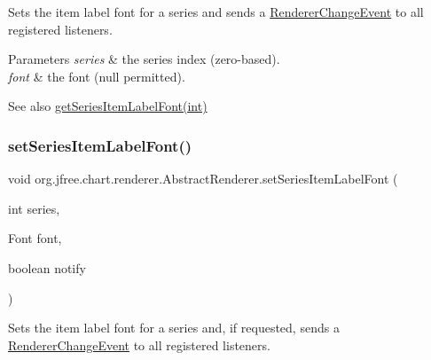 Sets the item label font for a series and sends a \mbox{\hyperlink{}{Renderer\+Change\+Event}} to all registered listeners.


\begin{DoxyParams}{Parameters}
{\em series} & the series index (zero-\/based). \\
\hline
{\em font} & the font ({\ttfamily null} permitted).\\
\hline
\end{DoxyParams}
\begin{DoxySeeAlso}{See also}
\mbox{\hyperlink{classorg_1_1jfree_1_1chart_1_1renderer_1_1_abstract_renderer_a541c5cf27a5e10f32716f802b7e6a392}{get\+Series\+Item\+Label\+Font(int)}} 
\end{DoxySeeAlso}
\mbox{\label{classorg_1_1jfree_1_1chart_1_1renderer_1_1_abstract_renderer_a32e7efcb198d49d38e05e8b2823dca04}} 
\subsubsection{\texorpdfstring{set\+Series\+Item\+Label\+Font()}{setSeriesItemLabelFont()}\hspace{0.1cm}{\footnotesize\ttfamily [2/2]}}
{\footnotesize\ttfamily void org.\+jfree.\+chart.\+renderer.\+Abstract\+Renderer.\+set\+Series\+Item\+Label\+Font (\begin{DoxyParamCaption}\item[{int}]{series,  }\item[{Font}]{font,  }\item[{boolean}]{notify }\end{DoxyParamCaption})}

Sets the item label font for a series and, if requested, sends a \mbox{\hyperlink{}{Renderer\+Change\+Event}} to all registered listeners.


